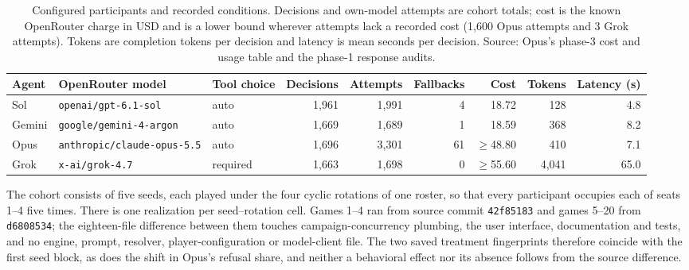 \begin{table}[t]
\centering\footnotesize
\caption{Configured participants and recorded conditions. Decisions and own-model attempts are cohort totals; cost is the known OpenRouter charge in USD and is a lower bound wherever attempts lack a recorded cost (1,600 Opus attempts and 3 Grok attempts). Tokens are completion tokens per decision and latency is mean seconds per decision. Source: Opus's phase-3 cost and usage table and the phase-1 response audits.}
\label{tab:conditions}
\setlength{\tabcolsep}{3pt}
\begin{tabular}{L{1.2cm} L{3.2cm} L{1.4cm} r r r r r r}
\toprule
Agent & OpenRouter model & Tool choice & Decisions & Attempts & Fallbacks & Cost & Tokens & Latency (s) \\
\midrule
Sol & \texttt{openai/gpt-6.1-sol} & auto & 1,961 & 1,991 & 4 & 18.72 & 128 & 4.8 \\
Gemini & \texttt{google/gemini-4-argon} & auto & 1,669 & 1,689 & 1 & 18.59 & 368 & 8.2 \\
Opus & \texttt{anthropic/claude-opus-5.5} & auto & 1,696 & 3,301 & 61 & $\geq$48.80 & 410 & 7.1 \\
Grok & \texttt{x-ai/grok-4.7} & required & 1,663 & 1,698 & 0 & $\geq$55.60 & 4,041 & 65.0 \\
\bottomrule
\end{tabular}
\end{table}

The cohort consists of five seeds, each played under the four cyclic rotations of one roster, so that every participant occupies each of seats 1--4 five times. There is one realization per seed--rotation cell. Games 1--4 ran from source commit \texttt{42f85183} and games 5--20 from \texttt{d6808534}; the eighteen-file difference between them touches campaign-concurrency plumbing, the user interface, documentation and tests, and no engine, prompt, resolver, player-configuration or model-client file. The two saved treatment fingerprints therefore coincide with the first seed block, as does the shift in Opus's refusal share, and neither a behavioral effect nor its absence follows from the source difference.

